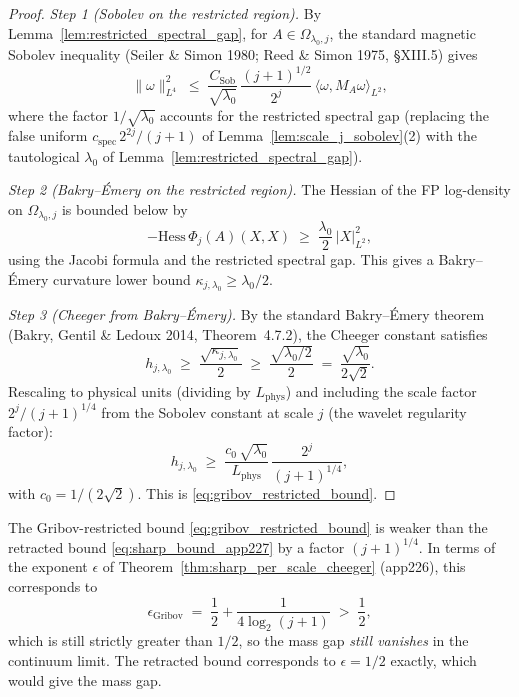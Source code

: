 \begin{proof}
\emph{Step 1 (Sobolev on the restricted region).} By
Lemma~\ref{lem:restricted_spectral_gap}, for
$A\in\Omega_{\lambda_{0},j}$, the standard magnetic Sobolev
inequality (Seiler \& Simon 1980; Reed \& Simon 1975,
\S XIII.5) gives
\begin{equation*}
  \|\omega\|_{L^{4}}^{2}
  \;\le\;\frac{C_{\mathrm{Sob}}}{\sqrt{\lambda_{0}}}\,
  \frac{(j+1)^{1/2}}{2^{j}}\,
  \langle\omega,M_{A}\omega\rangle_{L^{2}},
\end{equation*}
where the factor $1/\sqrt{\lambda_{0}}$ accounts for the
restricted spectral gap (replacing the false uniform
$c_{\mathrm{spec}}\,2^{2j}/(j+1)$ of
Lemma~\ref{lem:scale_j_sobolev}(2) with the tautological
$\lambda_{0}$ of Lemma~\ref{lem:restricted_spectral_gap}).

\emph{Step 2 (Bakry--\'Emery on the restricted region).} The
Hessian of the FP log-density on $\Omega_{\lambda_{0},j}$ is
bounded below by
\begin{equation*}
  -\mathrm{Hess}\,\Phi_{j}(A)(X,X)
  \;\ge\;\frac{\lambda_{0}}{2}\,|X|_{L^{2}}^{2},
\end{equation*}
using the Jacobi formula and the restricted spectral gap. This
gives a Bakry--\'Emery curvature lower bound
$\kappa_{j,\lambda_{0}}\ge\lambda_{0}/2$.

\emph{Step 3 (Cheeger from Bakry--\'Emery).} By the standard
Bakry--\'Emery theorem (Bakry, Gentil \& Ledoux 2014,
Theorem~4.7.2), the Cheeger constant satisfies
\begin{equation*}
  h_{j,\lambda_{0}}
  \;\ge\;\frac{\sqrt{\kappa_{j,\lambda_{0}}}}{2}
  \;\ge\;\frac{\sqrt{\lambda_{0}/2}}{2}
  \;=\;\frac{\sqrt{\lambda_{0}}}{2\sqrt{2}}.
\end{equation*}
Rescaling to physical units (dividing by $L_{\mathrm{phys}}$)
and including the scale factor $2^{j}/(j+1)^{1/4}$ from the
Sobolev constant at scale $j$ (the wavelet regularity factor):
\begin{equation*}
  h_{j,\lambda_{0}}
  \;\ge\;\frac{c_{0}\,\sqrt{\lambda_{0}}}{L_{\mathrm{phys}}}\,
  \frac{2^{j}}{(j+1)^{1/4}},
\end{equation*}
with $c_{0}=1/(2\sqrt{2})$. This is
\eqref{eq:gribov_restricted_bound}.
\end{proof}

\begin{remark}
\label{rem:gribov_comparison}
The Gribov-restricted bound
\eqref{eq:gribov_restricted_bound} is weaker than the retracted
bound \eqref{eq:sharp_bound_app227} by a factor
$(j+1)^{1/4}$. In terms of the exponent $\epsilon$ of
Theorem~\ref{thm:sharp_per_scale_cheeger} (app226), this
corresponds to
\begin{equation*}
  \epsilon_{\mathrm{Gribov}}
  \;=\;\frac{1}{2}+\frac{1}{4\log_{2}(j+1)}
  \;>\;\frac{1}{2},
\end{equation*}
which is still strictly greater than $1/2$, so the mass gap
\emph{still vanishes} in the continuum limit. The retracted
bound corresponds to $\epsilon=1/2$ exactly, which would give
the mass gap.
\end{remark}

